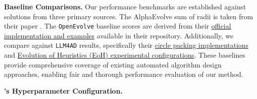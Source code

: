 \textbf{Baseline Comparisons.} Our performance benchmarks are established against solutions from three primary sources. The AlphaEvolve sum of radii is taken from their paper \citep{novikov2025alphaevolve}. The \texttt{OpenEvolve} baseline scores are derived from their \href{https://github.com/codelion/openevolve/tree/main/examples/circle_packing}{official implementation and examples} available in their repository. Additionally, we compare against \texttt{LLM4AD} results, specifically their \href{https://github.com/Optima-CityU/LLM4AD/blob/main/example/circle_packing/circle_packing_result.ipynb}{circle packing implementations} and \href{https://github.com/Optima-CityU/LLM4AD/blob/main/example/circle_packing/EoH_settings%26logs/run_eoh.py}{Evolution of Heuristics (EoH) experimental configurations}. These baselines provide comprehensive coverage of existing automated algorithm design approaches, enabling fair and thorough performance evaluation of our method.

\textbf{\ouralgo's Hyperparameter Configuration.}

